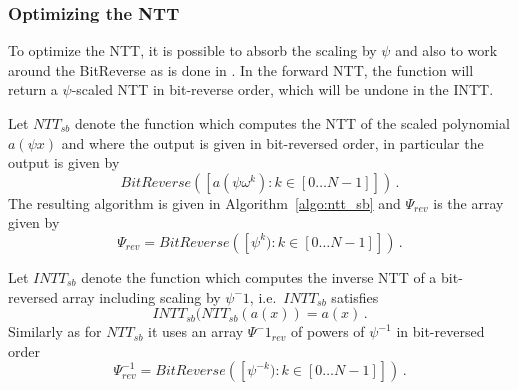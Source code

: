 \subsubsection{Optimizing the NTT}

To optimize the NTT, it is possible to absorb the scaling by $\psi$ and also to work around 
the BitReverse as is done in \cite{longa}.  In the forward NTT, the function will return a $\psi$-scaled NTT
in bit-reverse order, which will be undone in the INTT.

Let $NTT_{sb}$ denote the function which computes the NTT of the scaled polynomial $a(\psi x)$ and where the output 
is given in bit-reversed order, in particular the output is given by 
\[  BitReverse(  [a(\psi \omega^{k}) : k \in [0 \ldots N-1]]   ) \, .  \]
The resulting algorithm is given in Algorithm~\ref{algo:ntt_sb} and $\Psi_{rev}$ is the 
array given by 
\[ \Psi_{rev} = BitReverse( [ \psi^{k}) : k \in [0 \ldots N-1]] ) \, . \]

\begin{algorithm}[!t] \label{algo:ntt_sb}
\begin{scriptsize}
\caption{\emph{$NTT_{sb}$}}
\end{scriptsize}
\end{algorithm} 

Let $INTT_{sb}$ denote the function which computes the inverse NTT of a bit-reversed array 
including scaling by $\psi^-1$, i.e.\ $INTT_{sb}$ satisfies
\[ INTT_{sb} (NTT_{sb}(a(x)) = a(x) \, . \]
Similarly as for $NTT_{sb}$ it uses an array $\Psi^-1_{rev}$ of powers of $\psi^{-1}$ in bit-reversed order
\[ \Psi^{-1}_{rev} = BitReverse( [ \psi^{-k}) : k \in [0 \ldots N-1]] ) \, . \]

